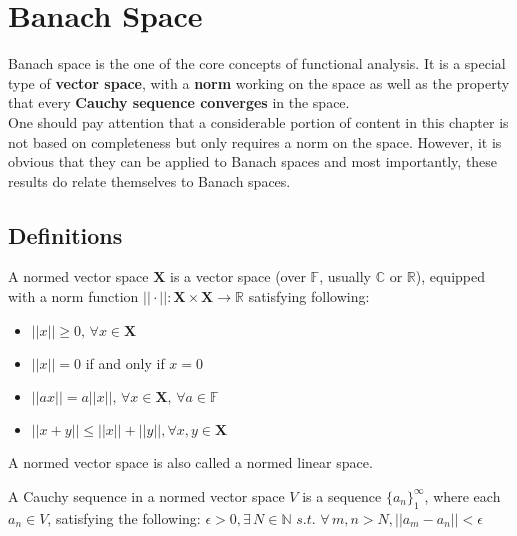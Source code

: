 \newpage







\section{Banach Space}\label{banach space def}%


Banach space is the one of the core concepts of functional analysis.  It is a special type of {\bf vector space}, with a {\bf norm} working on the space as well as the property that every {\bf Cauchy sequence converges} in the space.\\
One should pay attention that a considerable portion of content in this chapter is not based on completeness but only requires a norm on the space. However, it is obvious that they can be applied to Banach spaces and most importantly, these results do relate themselves to Banach spaces.


\subsection{Definitions}

\begin{definition}\rm\label{definition of norm}\nextline
	A normed vector space $\mathbf{X}$ is a vector space (over $\mathbb{F}$, usually $\mathbb{C}$ or $\mathbb{R}$), equipped with a norm function $|| \cdot||:\mathbf{X}\times \mathbf{X}\xrightarrow{}{\mathbb{R}}$ satisfying following:

	\begin{itemize}
		\item $||x||\geq0,\,\forall x\in\mathbf{X}$
		\item $||x||=0$ if and only if $x=0$
		\item $||ax||=a||x||,\, \forall x\in\mathbf{X},\, \forall a\in\mathbb{F}$
		\item $||x+y||\leq||x||+||y||,\forall x,y\in\mathbf{X}$
	\end{itemize}
	A normed vector  space is also called a normed linear space.
\end{definition}


\begin{definition}\rm\nextline
	\label{Cauchy Sequence}
	A Cauchy sequence in a normed vector space $V$ is a sequence $\{a_n\}_1^\infty$, where each $a_n\in V$, satisfying the following:
	$\epsilon>0,\exists\, N\in\mathbb{N}\,\,s.t.\,\,
		\forall\, m,n>N, ||a_m-a_n||<\epsilon$

\end{definition}

